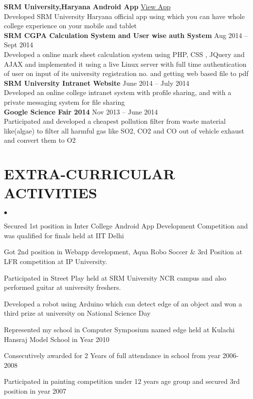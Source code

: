 \documentclass[margin,line]{res}
\newenvironment{list2}{
  \begin{list}{$\bullet$}{%
      \setlength{\itemsep}{0in}
      \setlength{\parsep}{0in} \setlength{\parskip}{0in}
      \setlength{\topsep}{0in} \setlength{\partopsep}{0in}
      \setlength{\leftmargin}{0.2in}}}{\end{list}}
\begin{document}
\begin{resume}
{\bf SRM University,Haryana Android App} \hfill \href{https://play.google.com/store/apps/details?id=com.SRM_University_Haryana.officialapp&hl=en}{View App}\\
Developed SRM University Haryana official app using which you can have whole college experience on your mobile and tablet\\

{\bf SRM CGPA Calculation System and User wise auth System} \hfill{Aug 2014 -- Sept 2014}\\
Developed a online mark sheet calculation system using PHP, CSS , JQuery and AJAX and implemented it using a live Linux server with full time authentication of user on input of its university registration no. and getting web based file to pdf\\

{\bf SRM University Intranet Website} \hfill{June 2014 -- July 2014}\\
Developed an online college intranet system  with profile sharing, and with a private messaging system for file sharing \\

{\bf Google Science Fair 2014} \hfill{Nov 2013 -- June 2014}\\
Participated  and developed a cheapest pollution filter from waste material like(algae) to filter all harmful gas like SO2, CO2 and CO out of  vehicle exhaust and convert them to O2\\


\section{\sc EXTRA-CURRICULAR ACTIVITIES}

\begin{list2}
\item Secured 1st position in Inter College Android App Development Competition and was qualified for finals held at IIT Delhi
\item Got 2nd position in Webapp development, Aqua Robo Soccer \& 3rd Position at LFR competition at IP University.
\item Participated in Street Play held at SRM University NCR campus and also performed guitar at university freshers.
\item Developed a robot using Arduino which can detect edge of an object and won a third prize at university on National Science Day
\item Represented my school in Computer Symposium named edge held at Kulachi Hansraj Model School in Year 2010
\item Consecutively awarded for 2 Years of full attendance in school from year 2006-2008
\item Participated in painting competition under 12 years age group and secured 3rd position in year 2007
\end{list2}


\end{resume}
\end{document}
